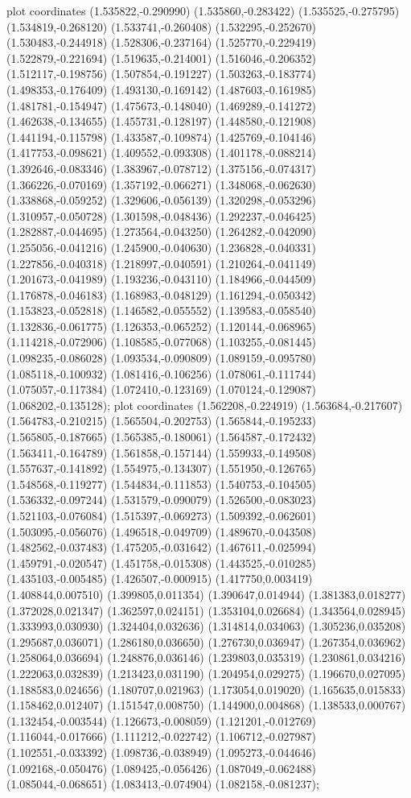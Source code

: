 { plot coordinates {(1.535822,-0.290990) (1.535860,-0.283422) (1.535525,-0.275795) (1.534819,-0.268120) (1.533741,-0.260408) (1.532295,-0.252670) (1.530483,-0.244918) (1.528306,-0.237164) (1.525770,-0.229419) (1.522879,-0.221694) (1.519635,-0.214001) (1.516046,-0.206352) (1.512117,-0.198756) (1.507854,-0.191227) (1.503263,-0.183774) (1.498353,-0.176409) (1.493130,-0.169142) (1.487603,-0.161985) (1.481781,-0.154947) (1.475673,-0.148040) (1.469289,-0.141272) (1.462638,-0.134655) (1.455731,-0.128197) (1.448580,-0.121908) (1.441194,-0.115798) (1.433587,-0.109874) (1.425769,-0.104146) (1.417753,-0.098621) (1.409552,-0.093308) (1.401178,-0.088214) (1.392646,-0.083346) (1.383967,-0.078712) (1.375156,-0.074317) (1.366226,-0.070169) (1.357192,-0.066271) (1.348068,-0.062630) (1.338868,-0.059252) (1.329606,-0.056139) (1.320298,-0.053296) (1.310957,-0.050728) (1.301598,-0.048436) (1.292237,-0.046425) (1.282887,-0.044695) (1.273564,-0.043250) (1.264282,-0.042090) (1.255056,-0.041216) (1.245900,-0.040630) (1.236828,-0.040331) (1.227856,-0.040318) (1.218997,-0.040591) (1.210264,-0.041149) (1.201673,-0.041989) (1.193236,-0.043110) (1.184966,-0.044509) (1.176878,-0.046183) (1.168983,-0.048129) (1.161294,-0.050342) (1.153823,-0.052818) (1.146582,-0.055552) (1.139583,-0.058540) (1.132836,-0.061775) (1.126353,-0.065252) (1.120144,-0.068965) (1.114218,-0.072906) (1.108585,-0.077068) (1.103255,-0.081445) (1.098235,-0.086028) (1.093534,-0.090809) (1.089159,-0.095780) (1.085118,-0.100932) (1.081416,-0.106256) (1.078061,-0.111744) (1.075057,-0.117384) (1.072410,-0.123169) (1.070124,-0.129087) (1.068202,-0.135128)};
 plot coordinates {(1.562208,-0.224919) (1.563684,-0.217607) (1.564783,-0.210215) (1.565504,-0.202753) (1.565844,-0.195233) (1.565805,-0.187665) (1.565385,-0.180061) (1.564587,-0.172432) (1.563411,-0.164789) (1.561858,-0.157144) (1.559933,-0.149508) (1.557637,-0.141892) (1.554975,-0.134307) (1.551950,-0.126765) (1.548568,-0.119277) (1.544834,-0.111853) (1.540753,-0.104505) (1.536332,-0.097244) (1.531579,-0.090079) (1.526500,-0.083023) (1.521103,-0.076084) (1.515397,-0.069273) (1.509392,-0.062601) (1.503095,-0.056076) (1.496518,-0.049709) (1.489670,-0.043508) (1.482562,-0.037483) (1.475205,-0.031642) (1.467611,-0.025994) (1.459791,-0.020547) (1.451758,-0.015308) (1.443525,-0.010285) (1.435103,-0.005485) (1.426507,-0.000915) (1.417750,0.003419) (1.408844,0.007510) (1.399805,0.011354) (1.390647,0.014944) (1.381383,0.018277) (1.372028,0.021347) (1.362597,0.024151) (1.353104,0.026684) (1.343564,0.028945) (1.333993,0.030930) (1.324404,0.032636) (1.314814,0.034063) (1.305236,0.035208) (1.295687,0.036071) (1.286180,0.036650) (1.276730,0.036947) (1.267354,0.036962) (1.258064,0.036694) (1.248876,0.036146) (1.239803,0.035319) (1.230861,0.034216) (1.222063,0.032839) (1.213423,0.031190) (1.204954,0.029275) (1.196670,0.027095) (1.188583,0.024656) (1.180707,0.021963) (1.173054,0.019020) (1.165635,0.015833) (1.158462,0.012407) (1.151547,0.008750) (1.144900,0.004868) (1.138533,0.000767) (1.132454,-0.003544) (1.126673,-0.008059) (1.121201,-0.012769) (1.116044,-0.017666) (1.111212,-0.022742) (1.106712,-0.027987) (1.102551,-0.033392) (1.098736,-0.038949) (1.095273,-0.044646) (1.092168,-0.050476) (1.089425,-0.056426) (1.087049,-0.062488) (1.085044,-0.068651) (1.083413,-0.074904) (1.082158,-0.081237)};
}
